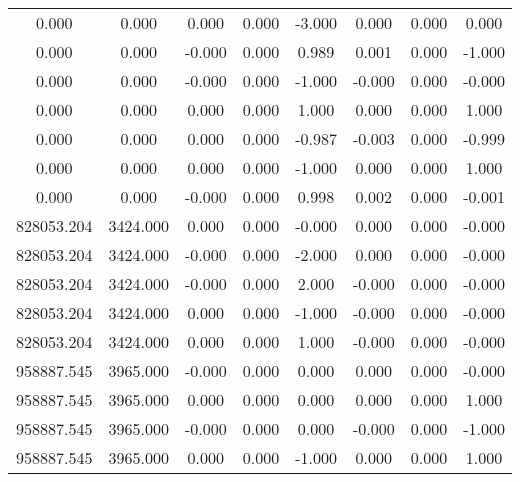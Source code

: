 \documentclass{article}
\begin{document}
\begin{center}
\begin{tabular}{| c | | c | c | c| c | c | c | c |}
     0.000   &       0.000   &       0.000   &       0.000   &      -3.000   &       0.000   &       0.000   &       0.000  \\
     0.000   &       0.000   &      -0.000   &       0.000   &       0.989   &       0.001   &       0.000   &      -1.000  \\
     0.000   &       0.000   &      -0.000   &       0.000   &      -1.000   &      -0.000   &       0.000   &      -0.000  \\
     0.000   &       0.000   &       0.000   &       0.000   &       1.000   &       0.000   &       0.000   &       1.000  \\
     0.000   &       0.000   &       0.000   &       0.000   &      -0.987   &      -0.003   &       0.000   &      -0.999  \\
     0.000   &       0.000   &       0.000   &       0.000   &      -1.000   &       0.000   &       0.000   &       1.000  \\
     0.000   &       0.000   &      -0.000   &       0.000   &       0.998   &       0.002   &       0.000   &      -0.001  \\
828053.204   &    3424.000   &       0.000   &       0.000   &      -0.000   &       0.000   &       0.000   &      -0.000  \\
828053.204   &    3424.000   &      -0.000   &       0.000   &      -2.000   &       0.000   &       0.000   &      -0.000  \\
828053.204   &    3424.000   &      -0.000   &       0.000   &       2.000   &      -0.000   &       0.000   &      -0.000  \\
828053.204   &    3424.000   &       0.000   &       0.000   &      -1.000   &      -0.000   &       0.000   &      -0.000  \\
828053.204   &    3424.000   &       0.000   &       0.000   &       1.000   &      -0.000   &       0.000   &      -0.000  \\
958887.545   &    3965.000   &      -0.000   &       0.000   &       0.000   &       0.000   &       0.000   &      -0.000  \\
958887.545   &    3965.000   &       0.000   &       0.000   &       0.000   &       0.000   &       0.000   &       1.000  \\
958887.545   &    3965.000   &      -0.000   &       0.000   &       0.000   &      -0.000   &       0.000   &      -1.000  \\
958887.545   &    3965.000   &       0.000   &       0.000   &      -1.000   &       0.000   &       0.000   &       1.000  \\

\end{tabular}
\end{center}
\end{document}
